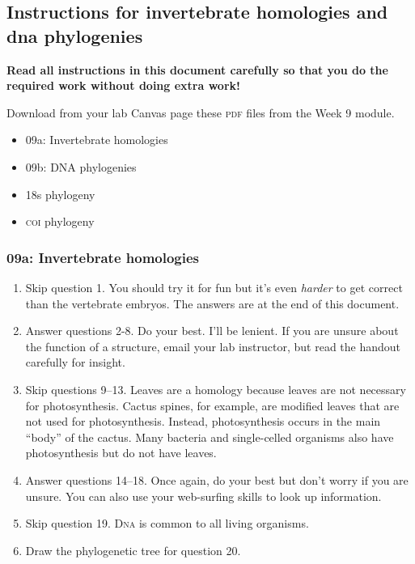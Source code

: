 \documentclass[12pt]{exam}
\begin{document}
\subsection*{Instructions for invertebrate homologies and dna phylogenies}


\textbf{Read all instructions in this document carefully so that you do the required work without doing extra work!}

Download from your lab Canvas page these \textsc{pdf} files from the Week 9 module.

\begin{itemize}
\item 09a: Invertebrate homologies
\item 09b: DNA phylogenies
\item 18s phylogeny
\item \textsc{coi} phylogeny
\end{itemize}

\subsubsection*{09a: Invertebrate homologies}

\begin{enumerate}

\item Skip question 1. You should try it for fun but it's even \emph{harder} to get correct than the vertebrate embryos. The answers are at the end of this document.

\item Answer questions 2-8. Do your best. I'll be lenient. If you are unsure about the function of a structure, email your lab instructor, but read the handout carefully for insight. 

\item Skip questions 9–13. Leaves are a homology because leaves are not necessary for photosynthesis. Cactus spines, for example, are modified leaves that are not used for photosynthesis. Instead, photosynthesis occurs in the main “body” of the cactus. Many bacteria and single-celled organisms also have photosynthesis but do not have leaves.

\item Answer questions 14–18. Once again, do your best but don't worry if you are unsure. You can also use your web-surfing skills to look up information. 

\item Skip question 19. D\textsc{na} is common to all living organisms.

\item Draw the phylogenetic tree for question 20.

\end{enumerate}
\end{document}
